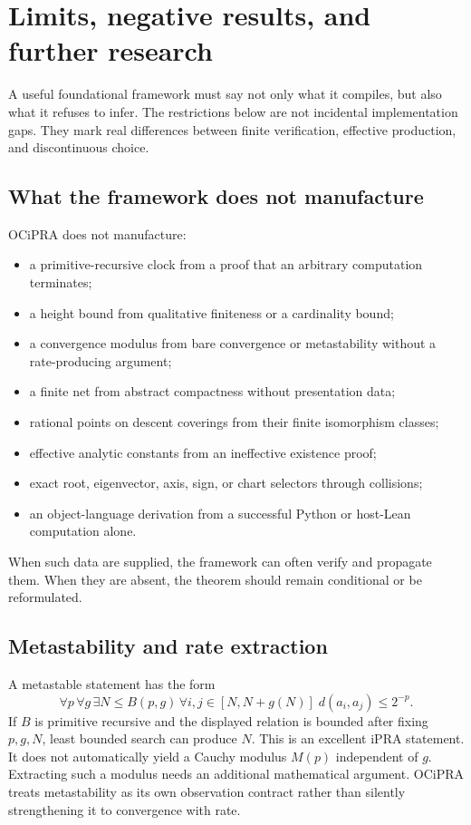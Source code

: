 \section{Limits, negative results, and further research}

A useful foundational framework must say not only what it compiles, but also what it refuses to infer.  The restrictions below are not incidental implementation gaps.  They mark real differences between finite verification, effective production, and discontinuous choice.

\subsection{What the framework does not manufacture}

OCiPRA does not manufacture:

\begin{itemize}
  \item a primitive-recursive clock from a proof that an arbitrary computation terminates;
  \item a height bound from qualitative finiteness or a cardinality bound;
  \item a convergence modulus from bare convergence or metastability without a rate-producing argument;
  \item a finite net from abstract compactness without presentation data;
  \item rational points on descent coverings from their finite isomorphism classes;
  \item effective analytic constants from an ineffective existence proof;
  \item exact root, eigenvector, axis, sign, or chart selectors through collisions;
  \item an object-language derivation from a successful Python or host-Lean computation alone.
\end{itemize}

When such data are supplied, the framework can often verify and propagate them.  When they are absent, the theorem should remain conditional or be reformulated.

\subsection{Metastability and rate extraction}

A metastable statement has the form
\[
 \forall p\,\forall g\,\exists N\leq B(p,g)\,
 \forall i,j\in[N,N+g(N)]\;d(a_i,a_j)\leq2^{-p}.
\]
If $B$ is primitive recursive and the displayed relation is bounded after fixing $p,g,N$, least bounded search can produce $N$.  This is an excellent iPRA statement.  It does not automatically yield a Cauchy modulus $M(p)$ independent of $g$.  Extracting such a modulus needs an additional mathematical argument.  OCiPRA treats metastability as its own observation contract rather than silently strengthening it to convergence with rate.

